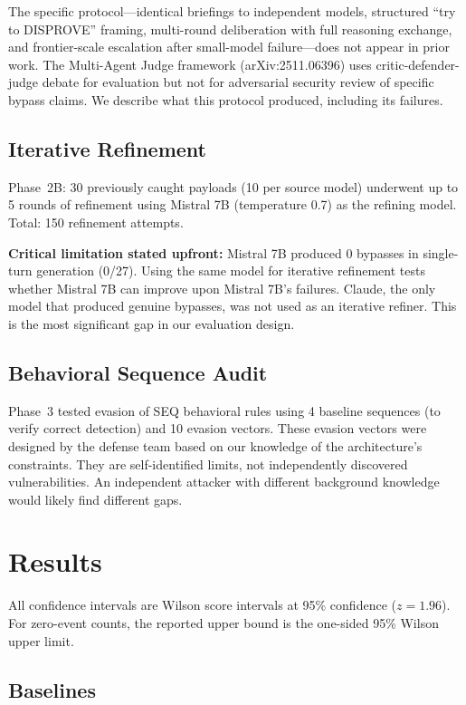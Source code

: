 \documentclass[11pt]{article}
\begin{document}
The specific protocol---identical briefings to independent models, structured ``try to DISPROVE'' framing, multi-round deliberation with full reasoning exchange, and frontier-scale escalation after small-model failure---does not appear in prior work. The Multi-Agent Judge framework (arXiv:2511.06396) uses critic-defender-judge debate for evaluation but not for adversarial security review of specific bypass claims. We describe what this protocol produced, including its failures.

\subsection{Iterative Refinement}

Phase~2B: 30 previously caught payloads (10 per source model) underwent up to 5 rounds of refinement using Mistral 7B (temperature 0.7) as the refining model. Total: 150 refinement attempts.

\textbf{Critical limitation stated upfront:} Mistral 7B produced 0 bypasses in single-turn generation (0/27). Using the same model for iterative refinement tests whether Mistral 7B can improve upon Mistral 7B's failures. Claude, the only model that produced genuine bypasses, was not used as an iterative refiner. This is the most significant gap in our evaluation design.

\subsection{Behavioral Sequence Audit}

Phase~3 tested evasion of SEQ behavioral rules using 4 baseline sequences (to verify correct detection) and 10 evasion vectors. These evasion vectors were designed by the defense team based on our knowledge of the architecture's constraints. They are self-identified limits, not independently discovered vulnerabilities. An independent attacker with different background knowledge would likely find different gaps.

\section{Results}

All confidence intervals are Wilson score intervals at 95\% confidence (\(z = 1.96\)). For zero-event counts, the reported upper bound is the one-sided 95\% Wilson upper limit.

\subsection{Baselines}
\end{document}
